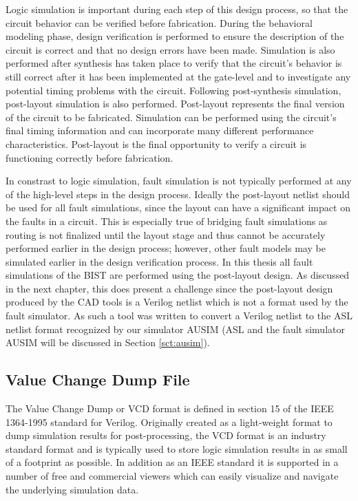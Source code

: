 \documentclass[12pt]{report}
\begin{document}
Logic simulation is important during each step of this design process, so that the circuit behavior can be verified before fabrication\cite{advancedverilog}.  During the behavioral modeling phase, design verification is performed to ensure the description of the circuit is correct and that no design errors have been made.  Simulation is also performed after synthesis has taken place to verify that the circuit's behavior is still correct after it has been implemented at the gate-level and to investigate any potential timing problems with the circuit\cite{advancedverilog}.  Following post-synthesis simulation, post-layout simulation is also performed.  Post-layout represents the final version of the circuit to be fabricated.  Simulation can be performed using the circuit's final timing information and can incorporate many different performance characteristics.  Post-layout is the final opportunity to verify a circuit is functioning correctly before fabrication\cite{advancedverilog}.

In constrast to logic simulation, fault simulation is not typically performed at any of the high-level steps in the design process\cite{stroud}.  Ideally the post-layout netlist should be used for all fault simulations, since the layout can have a significant impact on the faults in a circuit\cite{defectforcmos}.  This is especially true of bridging fault simulations as routing is not finalized until the layout stage and thus cannot be accurately performed earlier in the design process\cite{defectforcmos}; however, other fault models may be simulated earlier in the design verification process\cite{stroud}.  In this thesis all fault simulations of the BIST are performed using the post-layout design.  As discussed in the next chapter, this does present a challenge since the post-layout design produced by the CAD tools is a Verilog netlist which is not a format used by the fault simulator.  As such a tool was written to convert a Verilog netlist to the ASL netlist format recognized by our simulator AUSIM (ASL and the fault simulator AUSIM will be discussed in Section \ref{sct:ausim}).

\subsection{Value Change Dump File}
The Value Change Dump or VCD format is defined in section 15 of the IEEE 1364-1995 standard for Verilog\cite{verilog}.  Originally created as a light-weight format to dump simulation results for post-processing\cite{verilog}, the VCD format is an industry standard format and is typically used to store logic simulation results in as small of a footprint as possible\cite{verilog}.  In addition as an IEEE standard it is supported in a number of free and commercial viewers which can easily visualize and navigate the underlying simulation data. 
\end{document}
